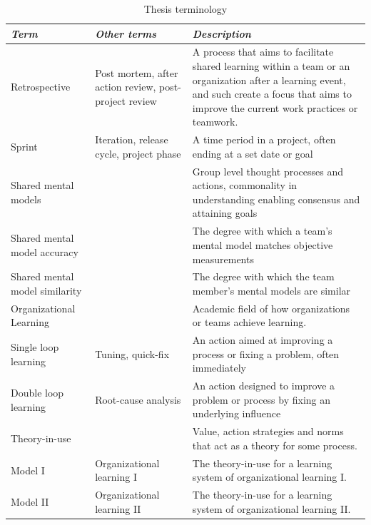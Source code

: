 \begin{table}
	\begin{centering}
		\label{table:thesis-terminology}
		\caption{Thesis terminology}
		\begin{tabular}{ p{} p{} p{}}
			\hline
			\textit{Term} & \textit{Other terms} & \textit{Description} \\
			\hline
			Retrospective & Post mortem, after action review, post-project review & A process that aims to facilitate shared learning within a team or an organization after a learning event, and such create a focus that aims to improve the current work practices or teamwork.  \\
			Sprint & Iteration, release cycle, project phase & A time period in a project, often ending at a set date or goal \\
			Shared mental models & & Group level thought processes and actions, commonality in understanding enabling consensus and attaining goals \\
			Shared mental model accuracy & & The degree with which a team's mental model matches objective measurements \\
			Shared mental model similarity & & The degree with which the team member's mental models are similar \\
			Organizational Learning & & Academic field of how organizations or teams achieve learning. \\
			Single loop learning & Tuning, quick-fix & An action aimed at improving a process or fixing a problem, often immediately \\
			Double loop learning & Root-cause analysis & An action designed to improve a problem or process by fixing an underlying influence \\
			Theory-in-use & & Value, action strategies and norms that act as a theory for some process. \\
			Model I & Organizational learning I & The theory-in-use for a learning system of organizational learning I. \\
			Model II & Organizational learning II & The theory-in-use for a learning system of organizational learning II. \\
			\hline
		\end{tabular}
	\end{centering}
\end{table}
\clearpage
